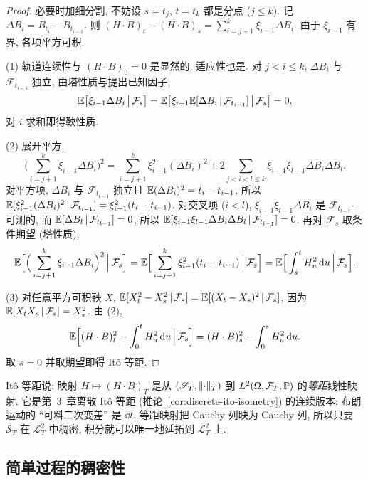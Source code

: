 \begin{proof}
必要时加细分割, 不妨设 $s=t_j$, $t=t_k$ 都是分点 ($j\le k$). 记 $\Delta B_i=B_{t_i}-B_{t_{i-1}}$. 则 $(H\cdot B)_t-(H\cdot B)_s=\sum_{i=j+1}^k\xi_{i-1}\Delta B_i$. 由于 $\xi_{i-1}$ 有界, 各项平方可积.

(1) 轨道连续性与 $(H\cdot B)_0=0$ 是显然的, 适应性也是. 对 $j<i\le k$, $\Delta B_i$ 与 $\mathcal{F}_{t_{i-1}}$ 独立, 由塔性质与提出已知因子,
\[
\E\big[\xi_{i-1}\Delta B_i\,\big|\,\mathcal{F}_s\big]=\E\big[\xi_{i-1}\E[\Delta B_i\,|\,\mathcal{F}_{t_{i-1}}]\,\big|\,\mathcal{F}_s\big]=0.
\]
对 $i$ 求和即得鞅性质.

(2) 展开平方,
\[
\Big(\sum_{i=j+1}^k\xi_{i-1}\Delta B_i\Big)^2=\sum_{i=j+1}^k\xi_{i-1}^2(\Delta B_i)^2+2\sum_{j<i<l\le k}\xi_{i-1}\xi_{l-1}\Delta B_i\Delta B_l.
\]
对平方项, $\Delta B_i$ 与 $\mathcal{F}_{t_{i-1}}$ 独立且 $\E(\Delta B_i)^2=t_i-t_{i-1}$, 所以 $\E[\xi_{i-1}^2(\Delta B_i)^2\,|\,\mathcal{F}_{t_{i-1}}]=\xi_{i-1}^2(t_i-t_{i-1})$. 对交叉项 ($i<l$), $\xi_{i-1}\xi_{l-1}\Delta B_i$ 是 $\mathcal{F}_{t_{l-1}}$-可测的, 而 $\E[\Delta B_l\,|\,\mathcal{F}_{t_{l-1}}]=0$, 所以 $\E[\xi_{i-1}\xi_{l-1}\Delta B_i\Delta B_l\,|\,\mathcal{F}_{t_{l-1}}]=0$. 再对 $\mathcal{F}_s$ 取条件期望 (塔性质),
\[
\E\Big[\Big(\sum_{i=j+1}^k\xi_{i-1}\Delta B_i\Big)^2\,\Big|\,\mathcal{F}_s\Big]=\E\Big[\sum_{i=j+1}^k\xi_{i-1}^2(t_i-t_{i-1})\,\Big|\,\mathcal{F}_s\Big]=\E\Big[\int_s^tH_u^2\dd u\,\Big|\,\mathcal{F}_s\Big].
\]

(3) 对任意平方可积鞅 $X$, $\E[X_t^2-X_s^2\,|\,\mathcal{F}_s]=\E[(X_t-X_s)^2\,|\,\mathcal{F}_s]$, 因为 $\E[X_tX_s\,|\,\mathcal{F}_s]=X_s^2$. 由 (2),
\[
\E\Big[(H\cdot B)_t^2-\int_0^tH_u^2\dd u\,\Big|\,\mathcal{F}_s\Big]=(H\cdot B)_s^2-\int_0^sH_u^2\dd u.
\]
取 $s=0$ 并取期望即得 It\^o 等距.
\end{proof}

It\^o 等距说: 映射 $H\mapsto(H\cdot B)_T$ 是从 $(\mathscr{S}_T,\norm{\cdot}_T)$ 到 $L^2(\Omega,\mathcal{F}_T,\P)$ 的\emph{等距}线性映射. 它是第~3~章离散 It\^o 等距 (推论~\ref{cor:discrete-ito-isometry}) 的连续版本: 布朗运动的 ``可料二次变差'' 是 $\dd t$. 等距映射把 Cauchy 列映为 Cauchy 列, 所以只要 $\mathscr{S}_T$ 在 $\mathscr{L}^2_T$ 中稠密, 积分就可以唯一地延拓到 $\mathscr{L}^2_T$ 上.

\subsection{简单过程的稠密性}

